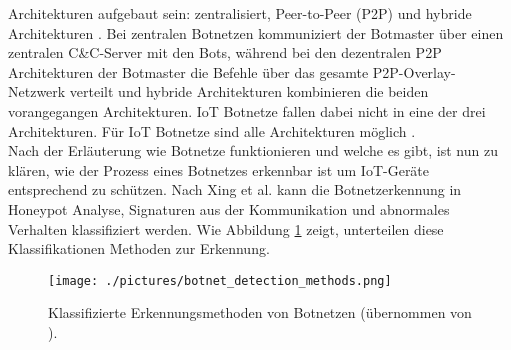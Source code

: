 Architekturen aufgebaut sein: zentralisiert, Peer-to-Peer (P2P) \cite{DBLP:journals/fi/VuSEBD21} und hybride Architekturen \cite{DBLP:conf/ecai2/ApostolTP22}. Bei zentralen Botnetzen kommuniziert der
Botmaster über einen zentralen C\&C-Server mit den Bots, während bei den dezentralen P2P Architekturen der Botmaster die Befehle über das gesamte P2P-Overlay-Netzwerk verteilt und hybride
Architekturen kombinieren die beiden vorangegangen Architekturen. IoT Botnetze fallen dabei nicht in eine der drei Architekturen. Für IoT Botnetze sind alle Architekturen möglich
\cite{DBLP:conf/csndsp/McNultyV22}. \\ Nach der Erläuterung wie Botnetze funktionieren und welche es gibt, ist nun zu klären, wie der Prozess eines Botnetzes erkennbar ist um IoT-Geräte entsprechend zu schützen. Nach Xing et al. \cite{Xing2021SurveyOB} kann die Botnetzerkennung in Honeypot Analyse, Signaturen aus der Kommunikation und abnormales Verhalten klassifiziert werden. Wie Abbildung
\ref{fig:bot_det_met} zeigt, unterteilen diese Klassifikationen Methoden zur Erkennung.

\begin{figure}[!ht]
    \centering
    \texttt{[image: ./pictures/botnet\_detection\_methods.png]}
    \caption{Klassifizierte Erkennungsmethoden von Botnetzen (übernommen von \cite{Xing2021SurveyOB}).}
    \label{fig:bot_det_met}
\end{figure}

